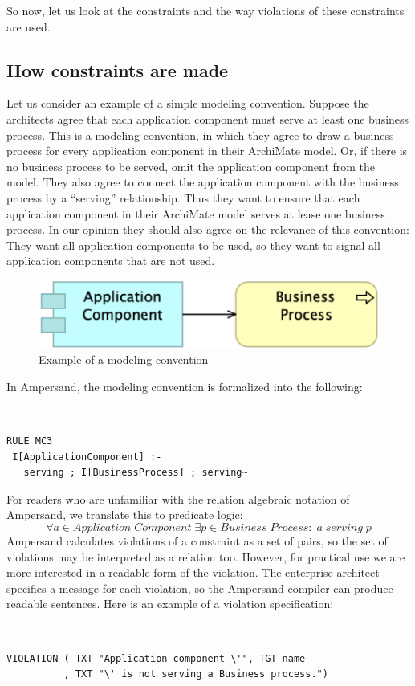 \documentclass[sn-vancouver]{sn-jnl}%
\theoremstyle{thmstyleone}%
\theoremstyle{thmstyletwo}%
\theoremstyle{thmstylethree}%
\begin{document}
So now, let us look at the constraints and the way violations of these constraints are used.

\subsection{How constraints are made}\label{method}
Let us consider an example of a simple modeling convention.
Suppose the architects agree that each application component must serve at least one business process.
This is a modeling convention, in which they agree to draw a business process for every application component in their ArchiMate model.
Or, if there is no business process to be served, omit the application component from the model.
They also agree to connect the application component with the business process by a ``serving'' relationship.
Thus they want to ensure that each application component in their ArchiMate model serves at lease one business process.
In our opinion they should also agree on the relevance of this convention:
They want all application components to be used,
so they want to signal all application components that are not used.
\begin{figure}[b]
\centering
\includegraphics[clip=true, scale=0.4]{policy3}
\caption{\small Example of a modeling convention}
\label{Policy3}
\end{figure}

In Ampersand, the modeling convention is formalized into the following:
{\tt\small
\begin{lstlisting}[frame=single, label={rulepolicy3}, caption={}]
RULE MC3
 I[ApplicationComponent] :- 
   serving ; I[BusinessProcess] ; serving~
\end{lstlisting}
}
For readers who are unfamiliar with the relation algebraic notation of Ampersand, we translate this to predicate logic:
\[\forall a \in Application\;Component \;\exists p\in Business\;Process:\; a \;serving \;p\]
Ampersand calculates violations of a constraint as a set of pairs,
so the set of violations may be interpreted as a relation too.
However, for practical use we are more interested in a readable form of the violation.
The enterprise architect specifies a message for each violation,
so the Ampersand compiler can produce readable sentences.
Here is an example of a violation specification:
{\tt\small
\begin{lstlisting}[frame=single, label={violation}, caption={}]
VIOLATION ( TXT "Application component \'", TGT name
          , TXT "\' is not serving a Business process.")
\end{lstlisting}
}
\end{document}
